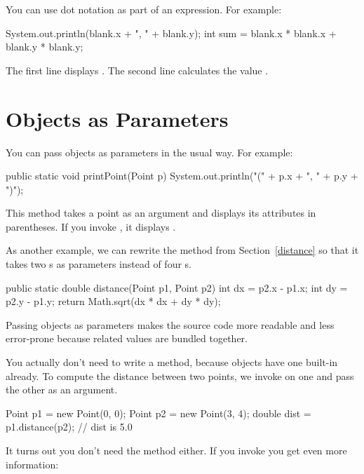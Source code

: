 You can use dot notation as part of an expression.
For example:

\begin{code}
System.out.println(blank.x + ", " + blank.y);
int sum = blank.x * blank.x + blank.y * blank.y;
\end{code}

The first line displays .
The second line calculates the value .


\section{Objects as Parameters}


You can pass objects as parameters in the usual way.
For example:

\begin{code}
public static void printPoint(Point p) {
    System.out.println("(" + p.x + ", " + p.y + ")");
}
\end{code}

This method takes a point as an argument and displays its attributes in parentheses.
If you invoke , it displays .

As another example, we can rewrite the  method from Section~\ref{distance} so that it takes two s as parameters instead of four s.

\begin{code}
public static double distance(Point p1, Point p2) {
    int dx = p2.x - p1.x;
    int dy = p2.y - p1.y;
    return Math.sqrt(dx * dx + dy * dy);
}
\end{code}

Passing objects as parameters makes the source code more readable and less error-prone because related values are bundled together.

You actually don't need to write a  method, because  objects have one built-in already.
To compute the distance between two points, we invoke  on one and pass the other as an argument.

\begin{code}
Point p1 = new Point(0, 0);
Point p2 = new Point(3, 4);
double dist = p1.distance(p2);  // dist is 5.0
\end{code}

It turns out you don't need the  method either.
If you invoke  you get even more information:

